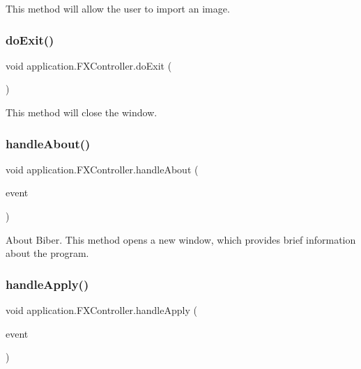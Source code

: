This method will allow the user to import an image. \mbox{\label{classapplication_1_1_f_x_controller_ae830da008c5d032e83dd11b075f4e9bf}} 
\subsubsection{\texorpdfstring{do\+Exit()}{doExit()}}
{\footnotesize\ttfamily void application.\+F\+X\+Controller.\+do\+Exit (\begin{DoxyParamCaption}{ }\end{DoxyParamCaption})}

This method will close the window. \mbox{\label{classapplication_1_1_f_x_controller_ac94b73f4dcdad256b2e4d5314dc42d2b}} 
\subsubsection{\texorpdfstring{handle\+About()}{handleAbout()}}
{\footnotesize\ttfamily void application.\+F\+X\+Controller.\+handle\+About (\begin{DoxyParamCaption}\item[{Action\+Event}]{event }\end{DoxyParamCaption})}

About Biber. This method opens a new window, which provides brief information about the program. \mbox{\label{classapplication_1_1_f_x_controller_ab9a4a2be0061da0337d29ace0a3d738e}} 
\subsubsection{\texorpdfstring{handle\+Apply()}{handleApply()}}
{\footnotesize\ttfamily void application.\+F\+X\+Controller.\+handle\+Apply (\begin{DoxyParamCaption}\item[{Action\+Event}]{event }\end{DoxyParamCaption})}

